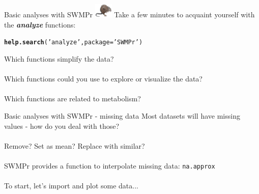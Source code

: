 \documentclass[xcolor=dvipsnames]{beamer}\usepackage[]{graphicx}\usepackage[]{color}
\makeatletter
\newcommand{\hlstr}[1]{\textcolor[rgb]{0.192,0.494,0.8}{#1}}%
\newcommand{\hlstd}[1]{\textcolor[rgb]{0.345,0.345,0.345}{#1}}%
\newcommand{\hlkwc}[1]{\textcolor[rgb]{0.333,0.667,0.333}{#1}}%
\newcommand{\hlkwd}[1]{\textcolor[rgb]{0.737,0.353,0.396}{\textbf{#1}}}%
\newenvironment{kframe}{%
 \def\at@end@of@kframe{}%
 \ifinner\ifhmode%
  \def\at@end@of@kframe{\end{minipage}}%
  \begin{minipage}{\columnwidth}%
 \fi\fi%
 \def\FrameCommand##1{\hskip\@totalleftmargin \hskip-\fboxsep
 \colorbox{shadecolor}{##1}\hskip-\fboxsep
     \hskip-\linewidth \hskip-\@totalleftmargin \hskip\columnwidth}%
 \MakeFramed {\advance\hsize-\width
   \@totalleftmargin\z@ \linewidth\hsize
   \@setminipage}}%
 {\par\unskip\endMakeFramed%
 \at@end@of@kframe}
\newenvironment{knitrout}{}{} %
\newcommand{\Bigtxt}[1]{\textbf{\textit{#1}}}
\makeatother
\begin{document}
\begin{frame}[fragile]{Basic analyses with SWMPr \includegraphics[width = 0.065\textwidth]{imgs/swmprat.png}}
\onslide<+->
Take a few minutes to acquaint yourself with the \Bigtxt{analyze} functions:
\begin{knitrout}\scriptsize
{}\color{fgcolor}\begin{kframe}
\begin{alltt}
\hlkwd{help.search}\hlstd{(}\hlstr{'analyze'}\hlstd{,} \hlkwc{package} \hlstd{=} \hlstr{'SWMPr'}\hlstd{)}
\end{alltt}
\end{kframe}
\end{knitrout}
\onslide<+->
Which functions simplify the data?  \\~\\
Which functions could you use to explore or visualize the data? \\~\\
Which functions are related to metabolism? 
\end{frame}

\begin{frame}{Basic analyses with SWMPr - missing data}
Most datasets will have missing values - how do you deal with those? \\~\\
Remove? Set as mean? Replace with similar? \\~\\
SWMPr provides a function to interpolate missing data: \texttt{na.approx} \\~\\
To start, let's import and plot some data...
\end{frame}
\end{document}
